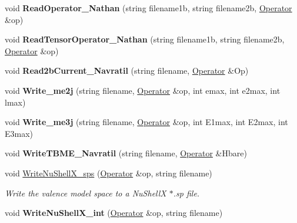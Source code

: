 \begin{DoxyCompactItemize}
\item 
void {\bfseries Read\+Operator\+\_\+\+Nathan} (string filename1b, string filename2b, \hyperlink{classOperator}{Operator} \&op)\hypertarget{classReadWrite_aba3deaad4a485577eb610db3da66bc79}{}\label{classReadWrite_aba3deaad4a485577eb610db3da66bc79}

\item 
void {\bfseries Read\+Tensor\+Operator\+\_\+\+Nathan} (string filename1b, string filename2b, \hyperlink{classOperator}{Operator} \&op)\hypertarget{classReadWrite_af4c7d4f545695db53e159981e13ad8d0}{}\label{classReadWrite_af4c7d4f545695db53e159981e13ad8d0}

\item 
void {\bfseries Read2b\+Current\+\_\+\+Navratil} (string filename, \hyperlink{classOperator}{Operator} \&Op)\hypertarget{classReadWrite_ab635d9908d2a7c7c66939afaac9678fa}{}\label{classReadWrite_ab635d9908d2a7c7c66939afaac9678fa}

\item 
void {\bfseries Write\+\_\+me2j} (string filename, \hyperlink{classOperator}{Operator} \&op, int emax, int e2max, int lmax)\hypertarget{classReadWrite_ac4e620913e1aa49ef541d2a0b7c631c5}{}\label{classReadWrite_ac4e620913e1aa49ef541d2a0b7c631c5}

\item 
void {\bfseries Write\+\_\+me3j} (string filename, \hyperlink{classOperator}{Operator} \&op, int E1max, int E2max, int E3max)\hypertarget{classReadWrite_a3aef884e7dca533e3abd10abf67feedb}{}\label{classReadWrite_a3aef884e7dca533e3abd10abf67feedb}

\item 
void {\bfseries Write\+T\+B\+M\+E\+\_\+\+Navratil} (string filename, \hyperlink{classOperator}{Operator} \&Hbare)\hypertarget{classReadWrite_a2b803d12e3fb1236f9fd80cb00de32a2}{}\label{classReadWrite_a2b803d12e3fb1236f9fd80cb00de32a2}

\item 
void \hyperlink{classReadWrite_a8a7dc85b22c8f468d153d3fde9f39394}{Write\+Nu\+Shell\+X\+\_\+sps} (\hyperlink{classOperator}{Operator} \&op, string filename)\hypertarget{classReadWrite_a8a7dc85b22c8f468d153d3fde9f39394}{}\label{classReadWrite_a8a7dc85b22c8f468d153d3fde9f39394}

\begin{DoxyCompactList}\small\item\em Write the valence model space to a Nu\+ShellX $\ast$.sp file. \end{DoxyCompactList}\item 
void {\bfseries Write\+Nu\+Shell\+X\+\_\+int} (\hyperlink{classOperator}{Operator} \&op, string filename)\hypertarget{classReadWrite_a2028159ab7f8c227613834b39794e157}{}\label{classReadWrite_a2028159ab7f8c227613834b39794e157}


\end{DoxyCompactItemize}
